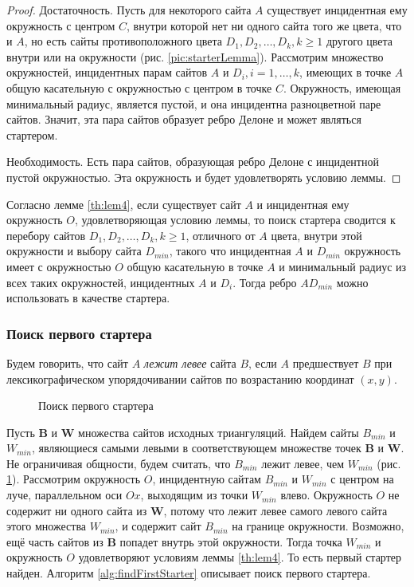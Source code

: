 \documentclass[12pt]{article}
\begin{document}
\begin{proof}
Достаточность. Пусть для некоторого сайта $A$ существует инцидентная ему окружность с центром $C$,
внутри которой нет ни одного сайта того же цвета, что и $A$,
но есть сайты противоположного цвета $D_1, D_2, \ldots, D_k, k \ge 1$ другого цвета внутри или на окружности (рис. \ref{pic:starterLemma}).
Рассмотрим множество окружностей, инцидентных парам сайтов $A$ и $D_i, i = 1, \ldots, k$,
имеющих в точке $A$ общую касательную с окружностью с центром в точке $C$.
Окружность, имеющая минимальный радиус, является пустой, и она инцидентна разноцветной паре сайтов.
Значит, эта пара сайтов образует ребро Делоне и может являться стартером.

Необходимость. Есть пара сайтов, образующая ребро Делоне с инцидентной пустой окружностью.
Эта окружность и будет удовлетворять условию леммы.
\end{proof}

Согласно лемме \ref{th:lem4}, если существует сайт $A$ и инцидентная ему окружность $O$, удовлетворяющая условию леммы,
то поиск стартера сводится к перебору сайтов $D_1, D_2, \ldots, D_k, k \ge 1$, отличного от $A$ цвета,
внутри этой окружности и выбору сайта $D_{min}$,
такого что инцидентная $A$ и $D_{min}$ окружность имеет с окружностью $O$ общую касательную в точке $A$ и
минимальный радиус из всех таких окружностей, инцидентных $A$ и $D_i$.
Тогда ребро $AD_{min}$ можно использовать в качестве стартера.

\subsubsection{Поиск первого стартера}
Будем говорить, что сайт $A$ {\itshape лежит левее} сайта $B$,
если $A$ предшествует $B$ при лексикографическом упорядочивании сайтов по возрастанию координат $(x, y)$.

\begin{figure}[htb!]
	\caption{Поиск первого стартера}
	\label{pic:starterExample}
\end{figure}

Пусть $\textbf{B}$ и $\textbf{W}$ множества сайтов исходных триангуляций.
Найдем сайты $B_{min}$ и $W_{min}$, являющиеся самыми левыми в соответствующем множестве точек $\textbf{B}$ и $\textbf{W}$.
Не ограничивая общности, будем считать, что $B_{min}$ лежит левее, чем $W_{min}$  (рис. \ref{pic:starterExample}).
Рассмотрим окружность $O$, инцидентную сайтам $B_{min}$ и $W_{min}$ с центром на луче, параллельном оси $Ox$,
выходящим из точки $W_{min}$ влево.
Окружность $O$ не содержит ни одного сайта из $\textbf{W}$, потому что лежит левее самого левого сайта этого множества $W_{min}$,
и содержит сайт $B_{min}$ на границе окружности.
Возможно, ещё часть сайтов из $\textbf{B}$ попадет внутрь этой окружности.
Тогда точка $W_{min}$ и окружность $O$ удовлетворяют условиям леммы \ref{th:lem4}.
То есть первый стартер найден.
Алгоритм \ref{alg:findFirstStarter} описывает поиск первого стартера.
\end{document}
